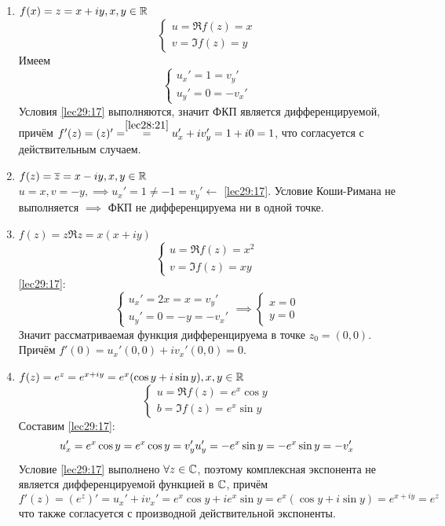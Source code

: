 \documentclass[../../main.tex]{subfiles}
\begin{document}
\begin{exmps}
\begin{enumerate}
	\item $ f(x) = z = x + iy, x, y \in \mathbb{R} $
	\[
	\begin{cases}
		u = \Re f(z) = x\\
		v = \Im f(z) = y
	\end{cases}
	\]
	Имеем 
	\[
	\begin{cases}
		u_x' = 1 = v_y'\\
		u_y' = 0 = -v_x'
	\end{cases}
	\]
	Условия \eqref{lec29:17} выполняются, значит ФКП является дифференцируемой,
	причём $ f'(z) = (z)' = \stackrel{\eqref{lec28:21}}{=} u_x' + iv_y' = 
	1 + i0 = 1 $, что согласуется с действительным случаем.
	\item $ f(z) = \overline{z} = x - iy, x, y \in \mathbb{R} $\\
	$ u = x, v = -y, \implies u_x' = 1 \neq -1 = v_y' \leftarrow $ 
	\eqref{lec29:17}. Условие Коши-Римана не выполняется $ \implies $ ФКП 
	не дифференцируема ни в одной точке.
	\item $ f(z) = z \Re z = x(x + iy) $
	\[
	\begin{cases}
		u = \Re f(z) = x^2\\
		v = \Im f(z) = xy
	\end{cases}
	\]
	\eqref{lec29:17}:
	\[
	\begin{cases}
		u_x' = 2x = x = v_y'\\
		u_y' = 0 = -y = -v_x'
	\end{cases} \implies
	\begin{cases}
		x = 0\\
		y = 0
	\end{cases}
	\]
	Значит рассматриваемая функция дифференцируема в точке $ z_0 = (0, 0) $.
	Причём
	$ f'(0) = u_x'(0, 0) + iv_x'(0, 0) = 0 $.
	\item $ f(z) = e^z = e^{x + iy} = e^x(\cos y + i\sin y), x, y \in \mathbb{R} $\\
	\[
	\begin{cases}
		u = \Re f(z) = e^x \cos y\\
		b = \Im f(z) = e^x \sin y
	\end{cases}
	\]
	Составим \eqref{lec29:17}:
	\[
	u_x' = e^x \cos y = e^x \cos y = v_y'\\
	u_y' = -e^x \sin y = -e^x \sin y = -v_x'
	\]
	Условие \eqref{lec29:17} выполнено $ \forall z \in \mathbb{C} $, 
	поэтому комплексная экспонента не является дифференцируемой функцией в $ \mathbb{C} 
	$, причём
	\[
	f'(z) = (e^z)' = u_x' + iv_x' = e^x \cos y + ie^x \sin y =
	e^x(\cos y + i\sin y) = e^{x + iy} = e^z
	\]
	что также согласуется с производной действительной экспоненты.
\end{enumerate}
\end{exmps}
\end{document}
